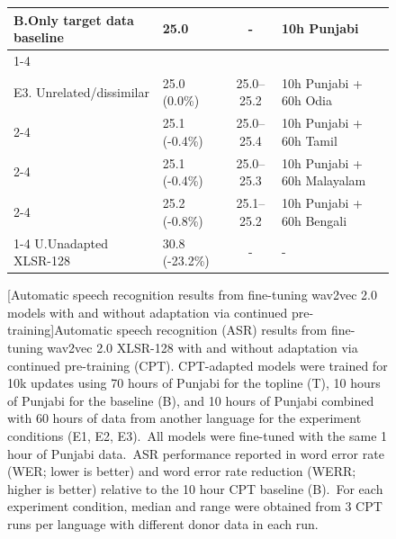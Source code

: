 \documentclass[main.tex]{subfiles}
\begin{document}
\begin{figure}[!b]
{\begin{tabular}{@{}llcl@{}}
\rowcolor{mygray} B.\hspace{0.75em}Only target data baseline & 25.0     & -                                                                      & 10h Punjabi                                      \\  \cmidrule{1-4} 
\multirow{4}{*}{\makecell{\vspace{-0.1em}\\E3. Unrelated/dissimilar}} & 25.0 (0.0\%)     & 25.0--25.2    & 10h Punjabi + 60h Odia                             \\  \cmidrule{2-4} 
         & 25.1 (-0.4\%)  & 25.0--25.4    & 10h Punjabi + 60h Tamil                            \\ \cmidrule{2-4}
         & 25.1 (-0.4\%)  & 25.0--25.3    & 10h Punjabi + 60h Malayalam                        \\  \cmidrule{2-4}
& 25.2 (-0.8\%)  & 25.1--25.2  & 10h Punjabi + 60h Bengali    \\ 
 \cmidrule{1-4}
U.\hspace{0.75em}Unadapted XLSR-128     & 30.8 (-23.2\%) &  -                                                                     & -                                               \\ \bottomrule
\end{tabular}
}

[Automatic speech recognition results from fine-tuning wav2vec 2.0 models with and without adaptation via continued pre-training]{Automatic speech recognition (ASR) results from fine-tuning wav2vec 2.0 XLSR-128 \cite{babu22_interspeech} with and without adaptation via continued pre-training (CPT). CPT-adapted models were trained for 10k updates using 70 hours of Punjabi for the topline (T), 10 hours of Punjabi for the baseline (B), and 10 hours of Punjabi combined with 60 hours of data from another language for the experiment conditions (E1, E2, E3).~All models were fine-tuned with the same 1 hour of Punjabi data.~ASR performance reported in word error rate (WER; lower is better) and word error rate reduction (WERR; higher is better) relative to the 10 hour CPT baseline (B).~For each experiment condition, median and range were obtained from 3 CPT runs per language with different donor data in each run.}
\label{tab:indic_results}


\end{figure}
\end{document}
